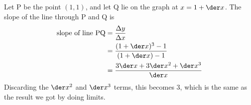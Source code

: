 Let P be the point $(1,1)$, and let Q lie on the graph at $x=1+\der x$.
The slope of the line through P and Q is
\begin{align*}
  \text{slope of line PQ} &= \frac{\Delta y}{\Delta x} \\
               &= \frac{(1+\der x)^3-1}{(1+\der x)-1} \\
               &= \frac{3\der x+3\der x^2+\der x^3}{\der x} \\
\end{align*}
Discarding the $\der x^2$ and $\der x^3$ terms, this becomes
3, which is the same as the result we got by doing limits.
